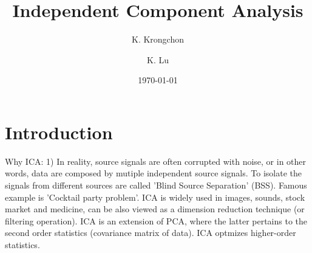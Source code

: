 \documentclass[aps,prl,preprint,superscriptaddress]{revtex4-2}
\begin{document}

\title{Independent Component Analysis}



\author{K. Krongchon}
\author{K. Lu}


\date{\today}

\begin{abstract}

\end{abstract}


\maketitle

\section{Introduction}
Why ICA: 1) In reality, source signals are often corrupted with noise, or in other words, data are composed by mutiple independent source signals. To isolate the signals from different sources are called 'Blind Source Separation' (BSS). Famous example is 'Cocktail party problem'. ICA is widely used in images, sounds, stock market and medicine, can be also viewed as a dimension reduction technique (or filtering operation). ICA is an extension of PCA, where the latter pertains to the second order statistics (covariance matrix of data). ICA optmizes higher-order statistics.
\end{document}
